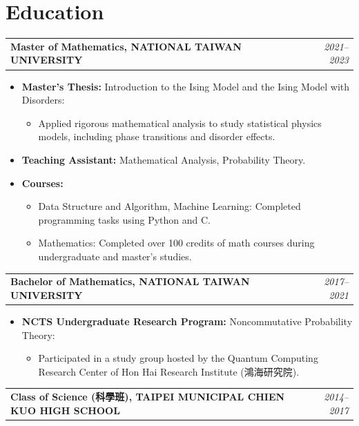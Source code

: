 \documentclass[a4paper,10pt]{article}
\newcommand{\coloredsection}[1]{\section*{\textcolor{blue!70!black}{#1}}}
\begin{document}
\coloredsection{Education}
\begin{tabularx}{\textwidth}{Xr}
    \textbf{Master of Mathematics, NATIONAL TAIWAN UNIVERSITY} & \textit{2021--2023} \\
\end{tabularx}
\begin{itemize}[leftmargin=30pt]
    \item \textbf{Master's Thesis:} Introduction to the Ising Model and the Ising Model with Disorders:
    \begin{itemize}
        \item Applied rigorous mathematical analysis to study statistical physics models, including phase transitions and disorder effects.
    \end{itemize}
    \item \textbf{Teaching Assistant:} Mathematical Analysis, Probability Theory.
    \item \textbf{Courses:}
    \begin{itemize}
        \item Data Structure and Algorithm, Machine Learning: Completed programming tasks using Python and C.
        \item Mathematics: Completed over 100 credits of math courses during undergraduate and master's studies.
    \end{itemize}
\end{itemize}

\noindent
\begin{tabularx}{\textwidth}{Xr}
    \textbf{Bachelor of Mathematics, NATIONAL TAIWAN UNIVERSITY} & \textit{2017--2021} \\
\end{tabularx}
\begin{itemize}[leftmargin=30pt]
    \item \textbf{NCTS Undergraduate Research Program:} Noncommutative Probability Theory:
    \begin{itemize}
        \item Participated in a study group hosted by the Quantum Computing Research Center of Hon Hai Research Institute (鴻海研究院).
    \end{itemize}
\end{itemize}

\noindent
\begin{tabularx}{\textwidth}{Xr}
    \textbf{Class of Science (科學班), TAIPEI MUNICIPAL CHIEN KUO HIGH SCHOOL} & \textit{2014--2017} \\
\end{tabularx}
\end{document}
